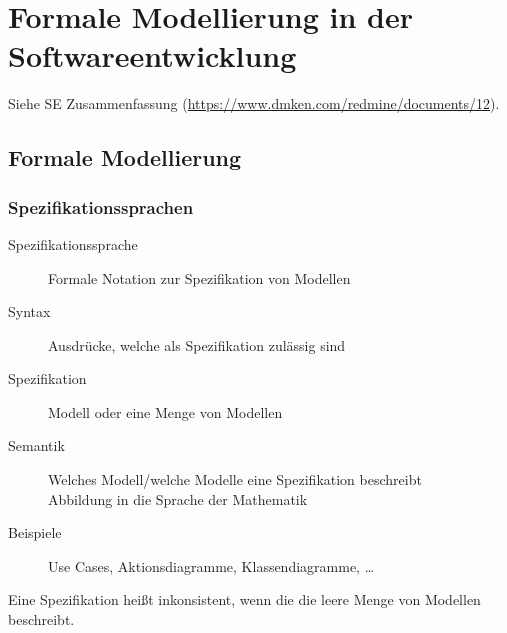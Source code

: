 
\chapter{Formale Modellierung in der Softwareentwicklung}
	Siehe SE Zusammenfassung (\url{https://www.dmken.com/redmine/documents/12}).

	\section{Formale Modellierung}
		\subsection{Spezifikationssprachen}
			\begin{description}
				\item[Spezifikationssprache] Formale Notation zur Spezifikation von Modellen
				\item[Syntax] Ausdrücke, welche als Spezifikation zulässig sind
				\item[Spezifikation] Modell oder eine Menge von Modellen
				\item[Semantik] Welches Modell/welche Modelle eine Spezifikation beschreibt \\ Abbildung in die Sprache der Mathematik
				\item[Beispiele] Use Cases, Aktionsdiagramme, Klassendiagramme, \dots
			\end{description}

			Eine Spezifikation heißt inkonsistent, wenn die die leere Menge von Modellen beschreibt.

